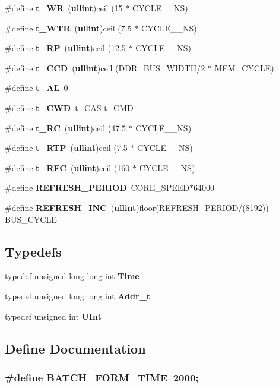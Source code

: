 \begin{CompactItemize}
\#define {\bf t\_\-WR}~({\bf ullint})ceil (15 $\ast$ CYCLE\_\_\-NS)
\item 
\#define {\bf t\_\-WTR}~({\bf ullint})ceil (7.5 $\ast$ CYCLE\_\_\-NS)
\item 
\#define {\bf t\_\-RP}~({\bf ullint})ceil (12.5 $\ast$ CYCLE\_\_\-NS)
\item 
\#define {\bf t\_\-CCD}~({\bf ullint})ceil (DDR\_\-BUS\_\-WIDTH/2 $\ast$ MEM\_\-CYCLE)
\item 
\#define {\bf t\_\-AL}~0
\item 
\#define {\bf t\_\-CWD}~t\_\-CAS-t\_\-CMD
\item 
\#define {\bf t\_\-RC}~({\bf ullint})ceil (47.5 $\ast$ CYCLE\_\_\-NS)
\item 
\#define {\bf t\_\-RTP}~({\bf ullint})ceil (7.5 $\ast$ CYCLE\_\_\-NS)
\item 
\#define {\bf t\_\-RFC}~({\bf ullint})ceil (160 $\ast$ CYCLE\_\_\-NS)
\item 
\#define {\bf REFRESH\_\-PERIOD}~CORE\_\-SPEED$\ast$64000
\item 
\#define {\bf REFRESH\_\-INC}~({\bf ullint})floor(REFRESH\_\-PERIOD/(8192)) - BUS\_\-CYCLE
\end{CompactItemize}
\subsection*{Typedefs}
\begin{CompactItemize}
\item 
typedef unsigned long long int {\bf Time}
\item 
typedef unsigned long long int {\bf Addr\_\-t}
\item 
typedef unsigned int {\bf UInt}
\end{CompactItemize}


\subsection{Define Documentation}
\subsubsection[{BATCH\_\-FORM\_\-TIME}]{\setlength{\rightskip}{0pt plus 5cm}\#define BATCH\_\-FORM\_\-TIME~2000;}\label{constants_8h_e7e3459c7023f3a7dcd68b382db8da3d}




